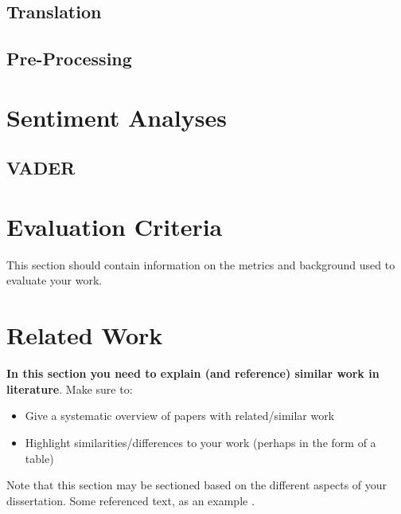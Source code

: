 \subsection{Translation}
\blindtext
\subsection{Pre-Processing}
\blindtext
{}


\section{Sentiment Analyses}
\blindtext
\subsection{\ac{VADER}}
\blindtext
{}

\section{Evaluation Criteria}
This section should contain information on the metrics and background used to evaluate your work.

\section{Related Work}
\textbf{In this section you need to explain (and reference) similar work in literature}.  Make sure to:

\begin{itemize}
 \item Give a systematic overview of papers with related/similar work
 \item Highlight similarities/differences to your work (perhaps in the form of a table)
\end{itemize}

Note that this section may be sectioned based on the different aspects of your dissertation.  Some referenced text, as an example \citep{Arrighi2003, WithersMartinez2012, Ebejer2016}.

